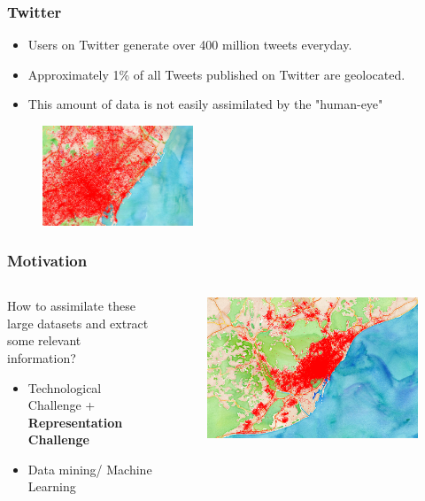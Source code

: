 \documentclass[hyperref={pdfpagelabels=true}]{beamer}
\begin{document}
\begin{frame}
\frametitle{Twitter}
\begin{itemize}    
      \item<1->Users on Twitter generate over 400 million tweets everyday.%
      \item<2->Approximately 1\% of all Tweets published on Twitter are geolocated.
      \item<3->This amount of data is not easily assimilated by the "human-eye"
\end{itemize}          
  \begin{figure}   
    \includegraphics[width=0.4\textwidth]{bigdata1.png}   
  \end{figure}     
\end{frame}

\begin{frame}
\frametitle{Motivation}
\begin{columns}
  \begin{column}{0.5\textwidth}\small{ 
      How to assimilate these large datasets and extract some relevant information?
      \begin{itemize}    
	    \item<2->Technological Challenge + \textbf{Representation Challenge}
	    \item<3->Data mining/ Machine Learning      
      \end{itemize}                }
  \end{column}
  \begin{column}{0.5\textwidth}      
	\begin{figure}   
	  \includegraphics[width=\textwidth]{bigdata2.png}   
	\end{figure}     
  \end{column}  
\end{columns}
\end{frame}
\end{document}

